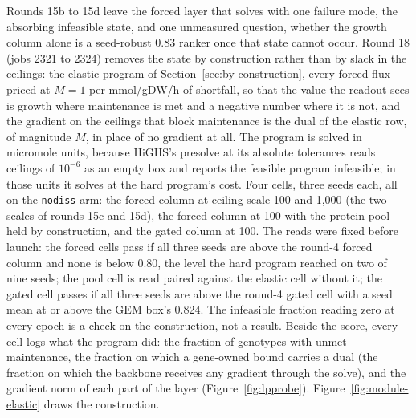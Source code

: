 Rounds 15b to 15d leave the forced layer that solves with one failure mode, the
absorbing infeasible state, and one unmeasured question, whether the growth column
alone is a seed-robust 0.83 ranker once that state cannot occur. Round 18 (jobs 2321
to 2324) removes the state by construction rather than by slack in the ceilings: the
elastic program of Section~\ref{sec:by-construction}, every forced flux priced at
$M = 1$ per mmol/gDW/h of shortfall, so that the value the readout sees is growth
where maintenance is met and a negative number where it is not, and the gradient on the
ceilings that block maintenance is the dual of the elastic row, of magnitude $M$, in
place of no gradient at all. The program is solved in micromole units, because HiGHS's
presolve at its absolute tolerances reads ceilings of $10^{-6}$ as an empty box and
reports the feasible program infeasible; in those units it solves at the hard program's
cost. Four cells, three seeds each, all on the \texttt{nodiss} arm: the forced column at
ceiling scale 100 and 1,000 (the two scales of rounds 15c and 15d), the forced column at
100 with the protein pool held by construction, and the gated column at 100. The reads
were fixed before launch: the forced cells pass if all three seeds are above the
round-4 forced column and none is below 0.80, the level the hard program reached on two
of nine seeds; the pool cell is read paired against the elastic cell without it; the
gated cell passes if all three seeds are above the round-4 gated cell with a seed mean
at or above the GEM box's 0.824. The infeasible fraction reading zero at every epoch is
a check on the construction, not a result. Beside the score, every cell logs what the
program did: the fraction of genotypes with unmet maintenance, the fraction on which a
gene-owned bound carries a dual (the fraction on which the backbone receives any
gradient through the solve), and the gradient norm of each part of the layer
(Figure~\ref{fig:lpprobe}). Figure~\ref{fig:module-elastic} draws the construction.




